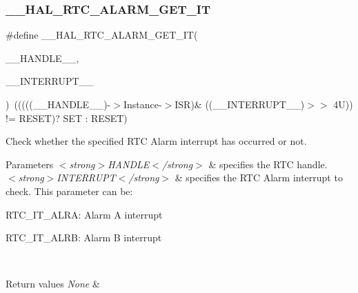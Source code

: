 \subsubsection{\texorpdfstring{\+\_\+\+\_\+\+H\+A\+L\+\_\+\+R\+T\+C\+\_\+\+A\+L\+A\+R\+M\+\_\+\+G\+E\+T\+\_\+\+IT}{\_\_HAL\_RTC\_ALARM\_GET\_IT}}
{\footnotesize\ttfamily \#define \+\_\+\+\_\+\+H\+A\+L\+\_\+\+R\+T\+C\+\_\+\+A\+L\+A\+R\+M\+\_\+\+G\+E\+T\+\_\+\+IT(\begin{DoxyParamCaption}\item[{}]{\+\_\+\+\_\+\+H\+A\+N\+D\+L\+E\+\_\+\+\_\+,  }\item[{}]{\+\_\+\+\_\+\+I\+N\+T\+E\+R\+R\+U\+P\+T\+\_\+\+\_\+ }\end{DoxyParamCaption})~(((((\+\_\+\+\_\+\+H\+A\+N\+D\+L\+E\+\_\+\+\_\+)-\/$>$Instance-\/$>$I\+SR)\& ((\+\_\+\+\_\+\+I\+N\+T\+E\+R\+R\+U\+P\+T\+\_\+\+\_\+)$>$$>$ 4\+U)) != R\+E\+S\+E\+T)? S\+E\+T \+: R\+E\+S\+E\+T)}



Check whether the specified R\+TC Alarm interrupt has occurred or not. 


\begin{DoxyParams}{Parameters}
{\em $<$strong$>$\+H\+A\+N\+D\+L\+E$<$/strong$>$} & specifies the R\+TC handle. \\
\hline
{\em $<$strong$>$\+I\+N\+T\+E\+R\+R\+U\+P\+T$<$/strong$>$} & specifies the R\+TC Alarm interrupt to check. This parameter can be\+: \begin{DoxyItemize}
\item R\+T\+C\+\_\+\+I\+T\+\_\+\+A\+L\+RA\+: Alarm A interrupt \item R\+T\+C\+\_\+\+I\+T\+\_\+\+A\+L\+RB\+: Alarm B interrupt \end{DoxyItemize}
\\
\hline
\end{DoxyParams}

\begin{DoxyRetVals}{Return values}
{\em None} & \\
\hline
\end{DoxyRetVals}
\mbox{\label{group___r_t_c___exported___macros_ga8068a537190e4c142b6d5bf41252ed01}} 
